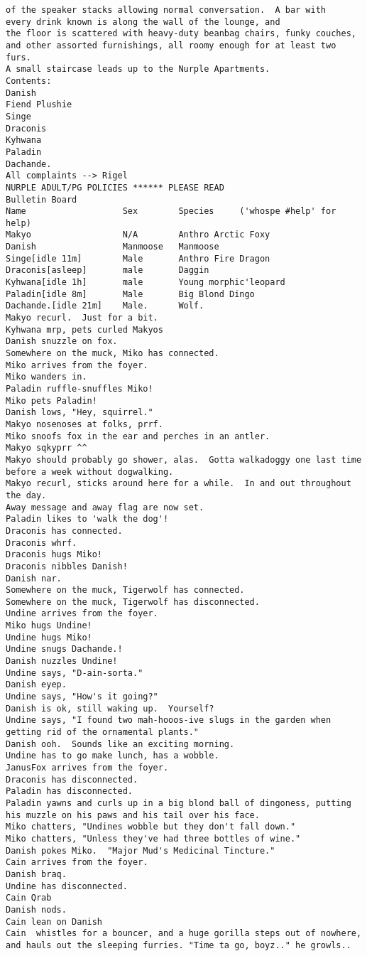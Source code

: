 \begin{verbatim}
of the speaker stacks allowing normal conversation.  A bar with
every drink known is along the wall of the lounge, and
the floor is scattered with heavy-duty beanbag chairs, funky couches,
and other assorted furnishings, all roomy enough for at least two furs.
A small staircase leads up to the Nurple Apartments.
Contents:
Danish
Fiend Plushie
Singe
Draconis
Kyhwana
Paladin
Dachande.
All complaints --> Rigel
NURPLE ADULT/PG POLICIES ****** PLEASE READ
Bulletin Board
Name                   Sex        Species     ('whospe #help' for help)
Makyo                  N/A        Anthro Arctic Foxy
Danish                 Manmoose   Manmoose
Singe[idle 11m]        Male       Anthro Fire Dragon
Draconis[asleep]       male       Daggin
Kyhwana[idle 1h]       male       Young morphic'leopard
Paladin[idle 8m]       Male       Big Blond Dingo
Dachande.[idle 21m]    Male.      Wolf.
Makyo recurl.  Just for a bit.
Kyhwana mrp, pets curled Makyos
Danish snuzzle on fox.
Somewhere on the muck, Miko has connected.
Miko arrives from the foyer.
Miko wanders in.
Paladin ruffle-snuffles Miko!
Miko pets Paladin!
Danish lows, "Hey, squirrel."
Makyo nosenoses at folks, prrf.
Miko snoofs fox in the ear and perches in an antler.
Makyo sqkyprr ^^
Makyo should probably go shower, alas.  Gotta walkadoggy one last time before a week without dogwalking.
Makyo recurl, sticks around here for a while.  In and out throughout the day.
Away message and away flag are now set.
Paladin likes to 'walk the dog'!
Draconis has connected.
Draconis whrf.
Draconis hugs Miko!
Draconis nibbles Danish!
Danish nar.
Somewhere on the muck, Tigerwolf has connected.
Somewhere on the muck, Tigerwolf has disconnected.
Undine arrives from the foyer.
Miko hugs Undine!
Undine hugs Miko!
Undine snugs Dachande.!
Danish nuzzles Undine!
Undine says, "D-ain-sorta."
Danish eyep.
Undine says, "How's it going?"
Danish is ok, still waking up.  Yourself?
Undine says, "I found two mah-hooos-ive slugs in the garden when getting rid of the ornamental plants."
Danish ooh.  Sounds like an exciting morning.
Undine has to go make lunch, has a wobble.
JanusFox arrives from the foyer.
Draconis has disconnected.
Paladin has disconnected.
Paladin yawns and curls up in a big blond ball of dingoness, putting his muzzle on his paws and his tail over his face.
Miko chatters, "Undines wobble but they don't fall down."
Miko chatters, "Unless they've had three bottles of wine."
Danish pokes Miko.  "Major Mud's Medicinal Tincture."
Cain arrives from the foyer.
Danish braq.
Undine has disconnected.
Cain Qrab
Danish nods.
Cain lean on Danish
Cain  whistles for a bouncer, and a huge gorilla steps out of nowhere, and hauls out the sleeping furries. "Time ta go, boyz.." he growls..

\end{verbatim}
